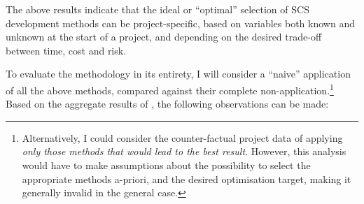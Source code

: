 \documentclass[a4paper,nobib,justified,final]{tufte-book}
\begin{document}
The above results indicate that the ideal or ``optimal'' selection of \acs{SCS} development methods can be project-specific, based on variables both known and unknown at the start of a project, and depending on the desired trade-off between time, cost and risk.

To evaluate the methodology in its entirety, I will consider a ``naive'' application of all the above methods, compared against their complete non-application.\footnote{Alternatively, I could consider the counter-factual project data of applying \emph{only those methods that would lead to the best result}. However, this analysis would have to make assumptions about the possibility to select the appropriate methods a-priori, and the desired optimisation target, making it generally invalid in the general case.}
Based on the aggregate results of , the following observations can be made:
\end{document}
